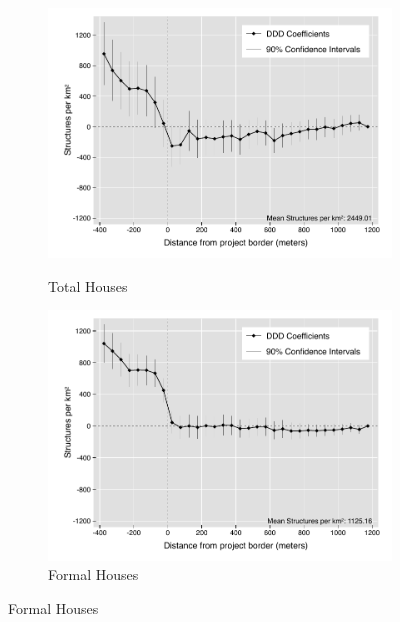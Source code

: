 \documentclass[12pt]{article}
\begin{document}
\begin{figure}[t!]
    \centering
    \vspace{2mm}
    \begin{subfigure}[b]{0.49\textwidth}
        \centering
        \caption[]{\small Total Houses}  
        \vspace{-1mm}
        \includegraphics[width=\textwidth,trim={.5cm .3cm .3cm 0cm}, clip=true]{figures/distplotDDD_bblu_total_buildings_admin_5.pdf}
        \label{fig:DDDtotal}
    \end{subfigure}
    \hfill
    \begin{subfigure}[b]{0.49\textwidth}  
        \centering 
        \caption[]{\small Formal Houses}
        \vspace{-1mm}
        \includegraphics[width=\textwidth,trim={.5cm .3cm .3cm 0cm}, clip=true]{figures/distplotDDD_bblu_for_admin_5.pdf}     

\end{subfigure}
\end{figure}
\end{document}
